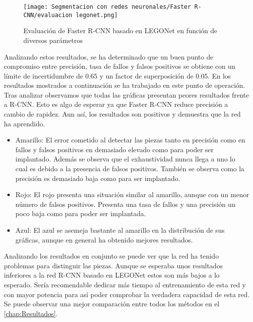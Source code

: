 \begin{figure}[ht]  %
	\centering
	\texttt{[image: Segmentacion con redes neuronales/Faster R-CNN/evaluacion legonet.png]}
	\caption{Evaluación de Faster R-CNN basado en LEGONet en función de diversos parámetros}
	\label{fig:Faster RCNN LEGONet evaluacion}
\end{figure}


Analizando estos resultados, se ha determinado que un buen punto de compromiso entre precisión, tasa de fallos y falsos positivos se obtiene con un límite de incertidumbre de 0.65 y un factor de superposición de 0.05. En los resultados mostrados a continuación se ha trabajado en este punto de operación. Tras analizar observamos que todas las gráficas presentan peores resultados frente a R-CNN. Esto es algo de esperar ya que Faster R-CNN reduce precisión a cambio de rapidez. Aun así, los resultados son positivos y demuestra que la red ha aprendido.

\begin{itemize}
\item Amarillo: El error cometido al detectar las piezas tanto en precisión como en fallos y falsos positivos en demasiado elevado como para poder ser implantado. Además se observa que el exhaustividad nunca llega a uno lo cual es debido a la presencia de falsos positivos. También se observa como la precisión es demasiado baja como para ser implantado.
\item Rojo: El rojo presenta una situación similar al amarillo, aunque con un menor número de falsos positivos. Presenta una tasa de fallos y una precisión un poco baja como para poder ser implantada.
\item Azul: El azul se asemeja bastante al amarillo en la distribución de sus gráficas, aunque en general ha obtenido mejores resultados.
\end{itemize}

Analizando los resultados en conjunto se puede ver que la red ha tenido problemas para distinguir las piezas. Aunque se esperaba unos resultados inferiores a la red R-CNN basado en LEGONet estos son más bajos a lo esperado. Sería recomendable dedicar más tiempo al entrenamiento de esta red y con mayor potencia para así poder comprobar la verdadera capacidad de esta red. Se puede observar una mejor comparación entre todos los métodos en el \autoref{chap:Resultados}.


